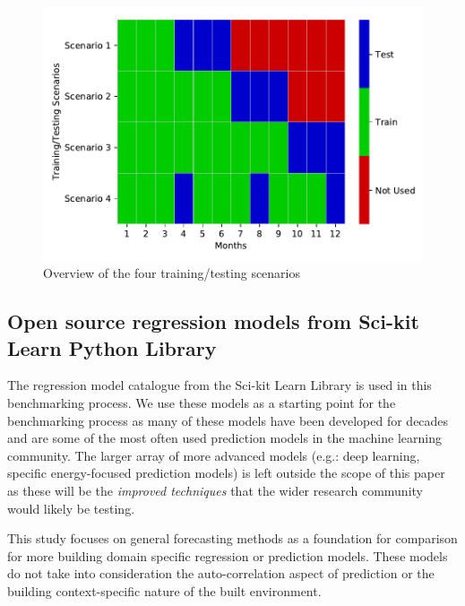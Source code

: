 \documentclass[preprint,12pt]{elsarticle}
\begin{document}
\begin{figure}[ht!]
\begin{center}
\includegraphics[width=1\columnwidth]{figures/traing-testing.pdf}
\caption{Overview of the four training/testing scenarios}
\label{fig:training}%
\end{center}
\end{figure}


\subsection{Open source regression models from Sci-kit Learn Python Library}
The regression model catalogue from the Sci-kit Learn Library is used in this benchmarking process. We use these models as a starting point for the benchmarking process as many of these models have been developed for decades and are some of the most often used prediction models in the machine learning community. The larger array of more advanced models (e.g.: deep learning, specific energy-focused prediction models) is left outside the scope of this paper as these will be the \emph{improved techniques} that the wider research community would likely be testing. 

This study focuses on general forecasting methods as a foundation for comparison for more building domain specific regression or prediction models. These models do not take into consideration the auto-correlation aspect of prediction or the building context-specific nature of the built environment. 
\end{document}
